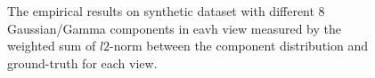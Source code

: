 \documentclass[11pt]{article}
\begin{document}
\begin{figure}
\caption{The empirical results on synthetic dataset with different 8 Gaussian/Gamma components in eavh view measured by the weighted sum of $l2$-norm between the component distribution and ground-truth for each view.}
\end{figure}
\end{document}
